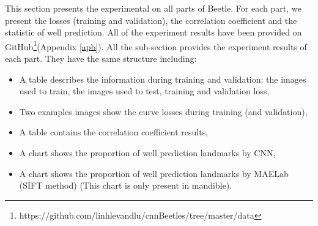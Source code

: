 \documentclass[12pt,a4paper]{article}
\begin{document}
This section presents the experimental on all parts of Beetle. For each part, we present the losses (training and validation), the correlation coefficient and the statistic of well prediction. All of the experiment results have been provided on GitHub\footnote{https://github.com/linhlevandlu/cnnBeetles/tree/master/data}(Appendix \ref{apb}). All the sub-section provides the experiment results of each part. They have the same structure including:
\begin{itemize}
	\item A table describes the information during training and validation: the images used to train, the images used to test, training and validation loss,
	\item Two examples images show the curve losses during training (and validation),
	\item A table contains the correlation coefficient results,
	\item A chart shows the proportion of well prediction landmarks by CNN,
	\item A chart shows the proportion of well prediction landmarks by MAELab (SIFT method) (This chart is only present in mandible).
\end{itemize}

\pagebreak
\end{document}

